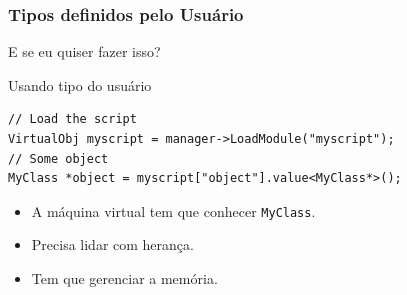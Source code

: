 \documentclass[brazil]{beamer}
\begin{document}
\begin{frame}[fragile]
  \frametitle{Tipos definidos pelo Usuário}
  \pause
  E se eu quiser fazer isso?
  \pause
  \begin{block}{Usando tipo do usuário}
    \begin{lstlisting}
// Load the script
VirtualObj myscript = manager->LoadModule("myscript");
// Some object
MyClass *object = myscript["object"].value<MyClass*>();
    \end{lstlisting}
  \end{block}
  \begin{itemize}
    \pause
    \item A máquina virtual tem que conhecer \texttt{MyClass}.
    \pause
    \item Precisa lidar com herança.
    \pause
    \item Tem que gerenciar a memória.
  \end{itemize}
\end{frame}
\end{document}
